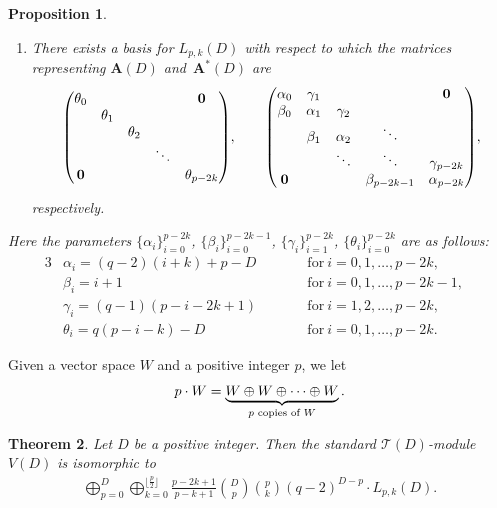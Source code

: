 \documentclass[10pt,a4paper]{amsart}
\def\A{\mathbf A}
\def\T{\mathcal T}
\numberwithin{equation}{section}
\newtheorem{Theorem}{Theorem}[section]
\newtheorem{Proposition}[Theorem]{Proposition}
 { \theoremstyle{definition}
\newtheorem{Definition}[Theorem]{Definition}
\newtheorem{Note}[Theorem]{Note}
\newtheorem{Example}[Theorem]{Example}
\newtheorem{Remark}[Theorem]{Remark} }
\begin{document}
\begin{Proposition}
\begin{enumerate}
\item[$(ii)$] There exists a basis for $L_{p,k}(D)$ with respect to which the matrices representing $\A(D)$ and~$\A^*(D)$ are
\begin{gather*}
\begin{pmatrix}
\theta_0 & & & &{\bf 0}
\\
 &\theta_1
\\
 & &\theta_2
 \\
 & & &\ddots
 \\
{\bf 0} & & & &\theta_{p-2k}
\end{pmatrix}\!,
\qquad
\begin{pmatrix}
\alpha_0 &\gamma_1 & & &{\bf 0}
\\
\beta_0 &\alpha_1 &\gamma_2
\\
&\beta_1 &\alpha_2 &\ddots
 \\
& &\ddots &\ddots &\gamma_{p-2k}
 \\
{\bf 0} & & &\beta_{p-2k-1} &\alpha_{p-2k}
\end{pmatrix}\!,
\end{gather*}
respectively.
\end{enumerate}
Here the parameters $\{\alpha_i\}_{i=0}^{p-2k}$,
$\{\beta_i\}_{i=0}^{p-2k-1}$, $\{\gamma_i\}_{i=1}^{p-2k}$, $\{\theta_i\}_{i=0}^{p-2k}$ are as follows:
\begin{alignat*}{3}
&\alpha_i=(q-2)(i+k)+p-D\qquad
&&\text{for}\ i=0,1,\dots,p-2k,&
\\
&\beta_i=i+1\qquad
&&\text{for}\ i=0,1,\dots,p-2k-1,&
\\
&\gamma_i=(q-1)(p-i-2k+1)\qquad
&&\text{for}\ i=1,2,\dots,p-2k,&
\\
&\theta_i=q(p-i-k)-D\qquad
&&\text{for} \ i=0,1,\dots,p-2k.&
\end{alignat*}
\end{Proposition}

Given a vector space $W$ and a positive integer $p$, we let
\[
p\cdot W=\underbrace{W\oplus W\oplus \cdots \oplus W}_
{\text{{\scriptsize $p$ copies of $W$}}}.
\]


\begin{Theorem}\label{thm:dec_T(D)module}
Let $D$ be a positive integer. Then the standard $\T(D)$-module $V(D)$ is isomorphic to
\begin{gather*}
\bigoplus_{p=0}^D\bigoplus_{k=0}^{\lfloor \frac{p}{2}\rfloor}
\frac{p-2k+1}{p-k+1}{D\choose p}{p\choose k}(q-2)^{D-p}\cdot L_{p,k}(D).
\end{gather*}
\end{Theorem}
\end{document}
